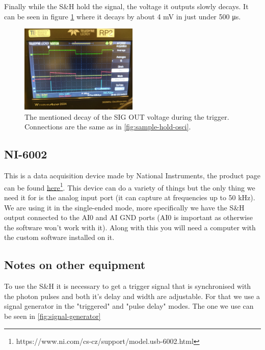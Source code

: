 \documentclass[a4paper, 10pt]{article}
\begin{document}
Finally while the S\&H hold the signal, the voltage it outputs slowly decays.
It can be seen in figure \cref{fig:sample-hold-decay} where it decays by about 4 \si{\milli\volt} in just under 500 \si{\micro\second}.

\begin{figure}[H]
    \centering
    \includegraphics[width=0.5\textwidth]{../images/sample-hold-decay.jpg}
    \caption{The mentioned decay of the SIG OUT voltage during the trigger. Connections are the same as in \cref{fig:sample-hold-osci}.}
    \label{fig:sample-hold-decay}
\end{figure}

\subsection{NI-6002} \label{subsec:sample-hold}
This is a data acquisition device made by National Instruments, the product page can be found \href{https://www.ni.com/cs-cz/support/model.usb-6002.html}{here}\footnote{https://www.ni.com/cs-cz/support/model.usb-6002.html}.
This device can do a variety of things but the only thing we need it for is the analog input port (it can capture at frequencies up to 50 \si{\kilo\hertz}).
We are using it in the single-ended mode, more specifically we have the S\&H output connected to the AI0 and AI GND ports (AI0 is important as otherwise the software won't work with it).
Along with this you will need a computer with the custom software installed on it.

\subsection{Notes on other equipment}
To use the S\&H it is necessary to get a trigger signal that is synchronised with the photon pulses and both it's delay and width are adjustable.
For that we use a signal generator in the "triggered" and "pulse delay" modes.
The one we use can be seen in \cref{fig:signal-generator}
\end{document}
